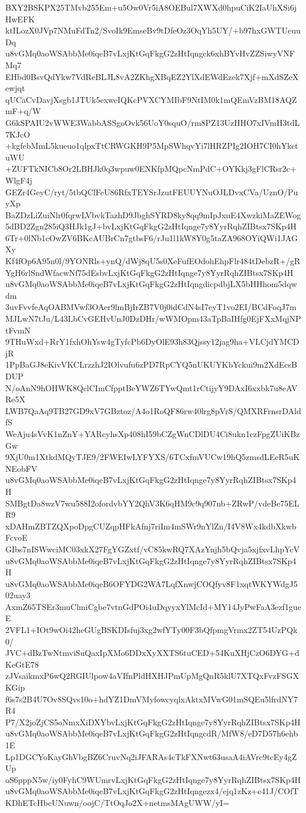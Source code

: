 BXY2BSKPX25TMvb255Em+u5Ow0Vr5iA8OEBul7XWXd0hpuCiK2IaUhXSi6jHwEFK
ktILozX0JVp7NMuFdTn2/SvoIk9EmseBv9tDfeOz3OqYh5UY/+b97hxGWTUeuuDq
u8vGMq0aoWSAbbMe0iqeB7vLxjKtGqFkgG2zHtIqngck6xhBYvHvZZSiwyVNFMq7
EHbd0BsvQdYkw7VdReBLJL8vA2ZKhgXBqEZ2YlXdEWdEzek7Xjf+mXdSZeXewjqt
qUCaCvDavjXsgb1JTUk5exweIQKcPVXCYMIbF9NtIM0k1mQEmVzBM18AQZmF+q/W
G6kSPAIU2vWWE3WabbASSgoOvk56UoY0squO/rm8PZ13UzHHO7xIVmH3tdL7KJcO
+kgfebMmL5kueuo1qlpxTtCRWGKH9P5MpSWhqvYi7lHRZPIg2IOH7CI0hYkctuWU
+ZUFTkNICb8Or2LBHJk0q3wpuw0ENKfpMQpcNmPdC+OYKkj3gFlCRsr2c+WlgF4j
GEZr4GeyC/ryt/5tbQClFeU86RfxTEYSrJzutFEUUYNuOJLDvxCVa/UznO/PuyXp
BaZDzLiZuiNlr0fqrwLVbvkTazhD9JbghSYRD8ky8qq9mIpJxuE4XwzkiMaZEWog
5dBD2Zgn285iQ3HJk1gJ+bvLxjKtGqFkgG2zHtIqnge7y8YyrRqhZIBtsx7SKp4H
6Tr+0lNb1cOwZV6BKcAUBrCn7gtbsF6/rJu1l1kW8Y0g5taZA968OYiQWi1JAGXy
Kf4fOp6A95n0l/9YONRls+ynQ/dWj8qU5s0XeFufEOdohEhpFlr484tDebzR+/gR
YgH6rlSndWfacwNf75dEsbvLxjKtGqFkgG2zHtIqnge7y8YyrRqhZIBtsx7SKp4H
u8vGMq0aoWSAbbMe0iqeB7vLxjKtGqFkgG2zHtIqngdicpdbjLX5bHHhom5dqwdm
3uvFvvfeAqOABMVwf3OAer9lmBjIrZB7V0j0idCdN4sI7eyT1vo2EI/BCdFoqJ7m
MJLwN7tJu/L43LbCvGEHvUnJ0DzDHr/wWMOpm43aTpBaIHfg0EjFXxMqjNPtFvmN
9THuWxd+RrY1fxhOhYsw4gTyfcPb6DyOlE93h83Qjssy12jag9ha+VLCjdYMCDjR
1PpBaGJ8eKivVKCLrzzhJ2IOlvufu6zPD7RpCYQ5nUKUYKbYckui9m2XdEcsBDUP
N/oAnN9hOHWK8QclCImCfpptBeYWZ6TYwQmt1rCtijyY9DAxI6xxbk7u8eAVRe5X
LWB7QaAq9TB27GD9xV7GBztoz/A4o1RoQF86rw40lrg8pVrS/QMXRFrnsrDAldfS
WeAju4sVvK1nZnY+YARcyhsXp408hI59bCZgWnCDlDU4Ci8ukn1czFpgZUiKBzGw
9XjU0m1XtkdMQyTJE9/2FWEIwLYFYXS/6TCxfmVUCw19hQ5zmsdLEeR5uKNEobFV
u8vGMq0aoWSAbbMe0iqeB7vLxjKtGqFkgG2zHtIqnge7y8YyrRqhZIBtsx7SKp4H
SMBgtDa8wzV7wu588I2ofordvbYY2QhV3K6qHM9c9q907nb+ZRwP/vdeBe75ELR9
xDAHmZBTZQXpoDpgCUZqpHFkAfnj7riIm4mSWr9nYlZn/I4V8Wx4kdbXkwbFcvoE
GIbs7nISWwciMC03xkX27FgYGZxtf/vC85kwRQ7XAzYnjh5bQvja5xjfxvLhpYcV
u8vGMq0aoWSAbbMe0iqeB7vLxjKtGqFkgG2zHtIqnge7y8YyrRqhZIBtsx7SKp4H
u8vGMq0aoWSAbbMe0iqeB6OFYDG2WA7LqfXnwjCOQfyv8F1xqtWKYWdgJ502uay3
AxmZ65TSEr3muClmiCgbe7vtnGdPOi4uDqyyxYlMcId+MY14JyPwFaA3ezf1gueE
2VFL1+IOt9wOi42heGUgBSKDIsfuj3xg2wfYTy00F3bQfpmgVrmx2ZT54UzPQk0/
JVC+dBzTwNtmviSuQaxIpXMo6DDxXyXXTS6tuCED+54KuXHjCzO6DYG+dKeGtE78
zJVsaikmxP6wQ2RGIUlpow4aVIfnPldHXHJPmUpMgQnR5klU7XTQxFvzFSGXKGip
f6s7s2B4U7Ov8SQvs10o+hdYZ1DmVMyfowcyqlxAktxMVwG01mSQEu5lfrdNY7R4
P7/X2joZjCS5oNmxXiDXYbvLxjKtGqFkgG2zHtIqnge7y8YyrRqhZIBtsx7SKp4H
u8vGMq0aoWSAbbMe0iqeB7vLxjKtGqFkgG2zHtIqngcdR/MfW8/eD7D57h6ehb1E
Lp1DGCYoKayGhVbgBZ6CruvNq2iJFARAs4cTkFXNwt63usaA4iAVrc9tcEy4gZUp
oS6pppN5w/iy0FyhC9WUmrvLxjKtGqFkgG2zHtIqnge7y8YyrRqhZIBtsx7SKp4H
u8vGMq0aoWSAbbMe0iqeB7vLxjKtGqFkgG2zHtIqngezx4/ejq1zKz+c41J/COfT
KDhETcHbcUNuwn/oojC/TtOqJo2X+netmsMAgUWW/yI=

